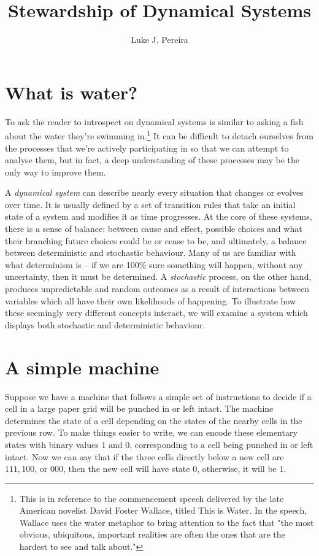 \documentclass{article}
\title{
    Stewardship of Dynamical Systems
}
\author{Luke J. Pereira}
\date{}
\begin{document}
\maketitle

\section{What is water?}
To ask the reader to introspect on dynamical systems is similar to asking a fish about the water they're swimming in.\footnote
{
    This is in reference to the commencement speech delivered by the late American novelist David Foster Wallace, titled This is Water\cite{dfw}. In the speech, Wallace uses the water metaphor to bring attention to the fact that "the most obvious, ubiquitous, important realities are often the ones that are the hardest to see and talk about."
}
It can be difficult to detach ourselves from the processes that we're actively participating in so that we can attempt to analyse them, but in fact, a deep understanding of these processes may be the only way to improve them. 

A \emph{dynamical system} can describe nearly every situation that changes or evolves over time. It is usually defined by a set of transition rules that take an initial state of a system and modifies it as time progresses. At the core of these systems, there is a sense of balance: between cause and effect, possible choices and what their branching future choices could be or cease to be, and ultimately, a balance between deterministic and stochastic behaviour. Many of us are familiar with what determinism is -- if we are 100\% sure something will happen, without any uncertainty, then it must be determined. A \emph{stochastic} process, on the other hand, produces unpredictable and random outcomes as a result of interactions between variables which all have their own likelihoods of happening. To illustrate how these seemingly very different concepts interact, we will examine a system which displays both stochastic and deterministic behaviour.


\section{A simple machine}
 Suppose we have a machine that follows a simple set of instructions to decide if a cell in a large paper grid will be punched in or left intact. The machine determines the state of a cell depending on the states of the nearby cells in the previous row. To make things easier to write, we can encode these elementary states with binary values $1$ and $0$, corresponding to a cell being punched in or left intact. Now we can say that if the three cells directly below a new cell are $111, 100$, or $000$, then the new cell will have state $0$, otherwise, it will be $1$.
 
\end{document}
